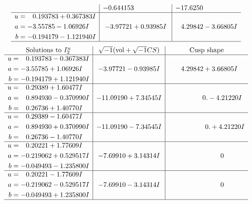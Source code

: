 \documentclass[1p]{elsarticle_modified}
\theoremstyle{definition}
\newcommand{\I}{\sqrt{-1}}
\begin{document}
$$\begin{array}{c|c|c}
 & -0.644153\phantom{ +0.000000I} & -17.6250\phantom{ +0.000000I} \\ \hline\begin{aligned}
u &= \phantom{-}0.193783 + 0.367383 I \\
a &= -3.55785 - 1.06926 I \\
b &= -0.194179 - 1.121940 I\end{aligned}
 & -3.97721 + 0.93985 I & \phantom{-}4.29842 - 3.66805 I\\
 \hline 
 \end{array}$$\newpage$$\begin{array}{c|c|c}  
\text{Solutions to }I^u_{2}& \I (\text{vol} + \sqrt{-1}CS) & \text{Cusp shape}\\
 \hline 
\begin{aligned}
u &= \phantom{-}0.193783 - 0.367383 I \\
a &= -3.55785 + 1.06926 I \\
b &= -0.194179 + 1.121940 I\end{aligned}
 & -3.97721 - 0.93985 I & \phantom{-}4.29842 + 3.66805 I \\ \hline\begin{aligned}
u &= \phantom{-}0.29389 + 1.60477 I \\
a &= \phantom{-}0.894930 - 0.370990 I \\
b &= \phantom{-}0.26736 + 1.40770 I\end{aligned}
 & -11.09190 + 7.34545 I & \phantom{-0.000000 } 0. - 4.21220 I \\ \hline\begin{aligned}
u &= \phantom{-}0.29389 - 1.60477 I \\
a &= \phantom{-}0.894930 + 0.370990 I \\
b &= \phantom{-}0.26736 - 1.40770 I\end{aligned}
 & -11.09190 - 7.34545 I & \phantom{-0.000000 -}0. + 4.21220 I \\ \hline\begin{aligned}
u &= \phantom{-}0.20221 + 1.77609 I \\
a &= -0.219062 + 0.529517 I \\
b &= -0.049493 - 1.235800 I\end{aligned}
 & -7.69910 + 3.14314 I & \phantom{-0.000000 } 0 \\ \hline\begin{aligned}
u &= \phantom{-}0.20221 - 1.77609 I \\
a &= -0.219062 - 0.529517 I \\
b &= -0.049493 + 1.235800 I\end{aligned}
 & -7.69910 - 3.14314 I & \phantom{-0.000000 } 0\\
 \hline 
 \end{array}$$\newpage
\end{document}
